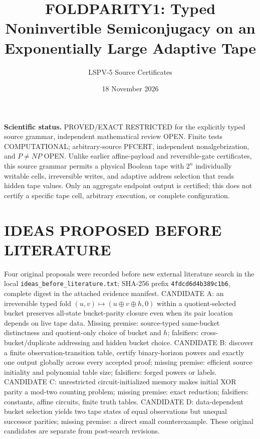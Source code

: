 \documentclass[11pt]{article}
\title{FOLDPARITY1: Typed Noninvertible Semiconjugacy on an Exponentially Large Adaptive Tape}
\author{LSPV-5 Source Certificates}
\date{18 November 2026}
\begin{document}
\maketitle
\noindent\textbf{Scientific status.} PROVED/EXACT RESTRICTED for the explicitly typed source grammar, independent mathematical review OPEN. Finite tests COMPUTATIONAL; arbitrary-source PFCERT, independent nonalgebrization, and $P\ne NP$ OPEN. Unlike earlier affine-payload and reversible-gate certificates, this source grammar permits a physical Boolean tape with $2^n$ individually writable cells, irreversible writes, and adaptive address selection that reads hidden tape values. Only an aggregate endpoint output is certified; this does not certify a specific tape cell, arbitrary execution, or complete configuration.

\section{IDEAS PROPOSED BEFORE LITERATURE}
Four original proposals were recorded before new external literature search in the local \texttt{ideas\_before\_literature.txt}; SHA-256 prefix \texttt{4fdcd6d4b389c1b6}, complete digest in the attached evidence manifest. CANDIDATE A: an irreversible typed fold $(u,v)\mapsto(u\oplus v\oplus h,0)$ within a quotient-selected bucket preserves all-state bucket-parity closure even when its pair location depends on live tape data. Missing premise: source-typed same-bucket distinctness and quotient-only choice of bucket and $h$; falsifiers: cross-bucket/duplicate addressing and hidden bucket choice. CANDIDATE B: discover a finite observation-transition table, certify binary-horizon powers and exactly one output globally across every accepted proof; missing premise: efficient source initiality and polynomial table size; falsifiers: forged powers or labels. CANDIDATE C: unrestricted circuit-initialized memory makes initial XOR parity a mod-two counting problem; missing premise: exact reduction; falsifiers: constants, affine circuits, finite truth tables. CANDIDATE D: data-dependent bucket selection yields two tape states of equal observations but unequal successor parities; missing premise: a direct small counterexample. These original candidates are separate from post-search revisions.
\end{document}
